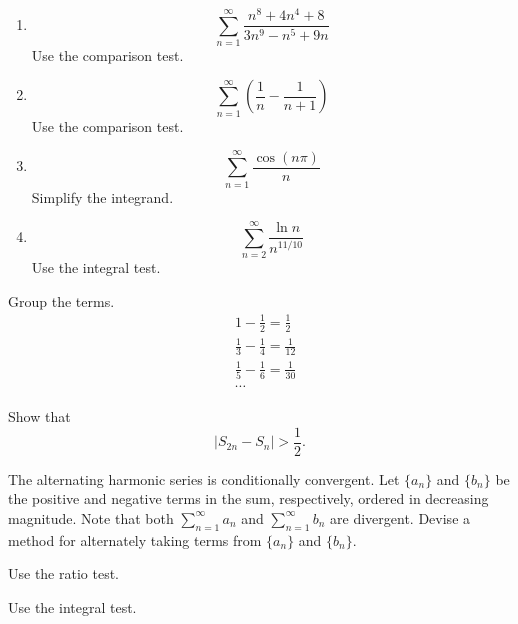 {\begin{Hint}
\begin{enumerate}
    \[
    \sum_{n=1}^\infty \frac{ (n!)^2 }{ (n^2)! }
    \]
    Apply the ratio test.
  \item
    \[
    \sum_{n=1}^\infty \frac{n^8 + 4 n^4 + 8}{3 n^9 - n^5 + 9 n}
    \]
    Use the comparison test.
  \item
    \[
    \sum_{n=1}^\infty \left( \frac{1}{n} - \frac{1}{n + 1} \right)
    \]
    Use the comparison test.
  \item
    \[
    \sum_{n=1}^\infty \frac{\cos( n \pi )}{n}
    \]
    Simplify the integrand.
  \item
    \[
    \sum_{n=2}^\infty \frac{ \ln n }{ n^{11/10} }
    \]
    Use the integral test.
  \end{enumerate}
\end{Hint}



\begin{Hint}
  \label{hint alternating harmonic series}
  Group the terms.
  \begin{align*}
    &1 - \frac{1}{2} = \frac{1}{2} 
    \\
    &\frac{1}{3} - \frac{1}{4} = \frac{1}{12} 
    \\
    &\frac{1}{5} - \frac{1}{6} = \frac{1}{30} 
    \\
    &\cdots
  \end{align*}
\end{Hint}




\begin{Hint}
  \label{hint divergent harmonic series}
  Show that
  \[
  |S_{2 n} - S_n| > \frac{1}{2}.
  \]
\end{Hint}


\begin{Hint}
  \label{hint rearrange alternating harmonic series}
  The alternating harmonic series is conditionally convergent.  
  Let $\{a_n\}$ and $\{b_n\}$ be the positive and negative terms in the sum, 
  respectively, ordered in decreasing magnitude.  Note that both $\sum_{n = 1}^\infty a_n$
  and $\sum_{n = 1}^\infty b_n$ are divergent.  Devise a method for alternately taking
  terms from $\{a_n\}$ and $\{b_n\}$.
\end{Hint}


\begin{Hint}
  \label{hint sum n!/n^n}
  Use the ratio test.
\end{Hint}


\begin{Hint}
  \label{hint harmonic series}
  Use the integral test.
\end{Hint}



}
